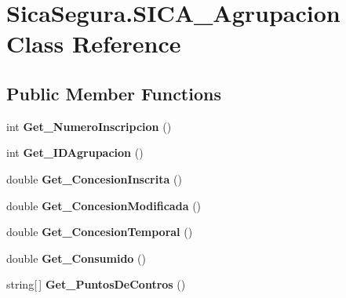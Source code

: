 \hypertarget{class_sica_segura_1_1_s_i_c_a___agrupacion}{}\section{Sica\+Segura.\+S\+I\+C\+A\+\_\+\+Agrupacion Class Reference}
\label{class_sica_segura_1_1_s_i_c_a___agrupacion}
\subsection*{Public Member Functions}
\begin{DoxyCompactItemize}
\item 
int {\bfseries Get\+\_\+\+Numero\+Inscripcion} ()\hypertarget{class_sica_segura_1_1_s_i_c_a___agrupacion_a09c4d394af2f286a3d182c7b373a6be8}{}\label{class_sica_segura_1_1_s_i_c_a___agrupacion_a09c4d394af2f286a3d182c7b373a6be8}

\item 
int {\bfseries Get\+\_\+\+I\+D\+Agrupacion} ()\hypertarget{class_sica_segura_1_1_s_i_c_a___agrupacion_a359ceda8d5d1bf4d5098db4ccd536e14}{}\label{class_sica_segura_1_1_s_i_c_a___agrupacion_a359ceda8d5d1bf4d5098db4ccd536e14}

\item 
double {\bfseries Get\+\_\+\+Concesion\+Inscrita} ()\hypertarget{class_sica_segura_1_1_s_i_c_a___agrupacion_a2563b37a9f8e96165a2396c40221afbc}{}\label{class_sica_segura_1_1_s_i_c_a___agrupacion_a2563b37a9f8e96165a2396c40221afbc}

\item 
double {\bfseries Get\+\_\+\+Concesion\+Modificada} ()\hypertarget{class_sica_segura_1_1_s_i_c_a___agrupacion_a6f1f88c6e030345e61fa89b9cf5f8d68}{}\label{class_sica_segura_1_1_s_i_c_a___agrupacion_a6f1f88c6e030345e61fa89b9cf5f8d68}

\item 
double {\bfseries Get\+\_\+\+Concesion\+Temporal} ()\hypertarget{class_sica_segura_1_1_s_i_c_a___agrupacion_a3b010fccb4df08e3a9168510a713ba4b}{}\label{class_sica_segura_1_1_s_i_c_a___agrupacion_a3b010fccb4df08e3a9168510a713ba4b}

\item 
double {\bfseries Get\+\_\+\+Consumido} ()\hypertarget{class_sica_segura_1_1_s_i_c_a___agrupacion_aa860531daee9cb0dee7abc0057ae05a4}{}\label{class_sica_segura_1_1_s_i_c_a___agrupacion_aa860531daee9cb0dee7abc0057ae05a4}

\item 
string\mbox{[}$\,$\mbox{]} {\bfseries Get\+\_\+\+Puntos\+De\+Contros} ()\hypertarget{class_sica_segura_1_1_s_i_c_a___agrupacion_a59a9ccb5b4d2118085fa1ce3efc8cb05}{}\label{class_sica_segura_1_1_s_i_c_a___agrupacion_a59a9ccb5b4d2118085fa1ce3efc8cb05}


\end{DoxyCompactItemize}
